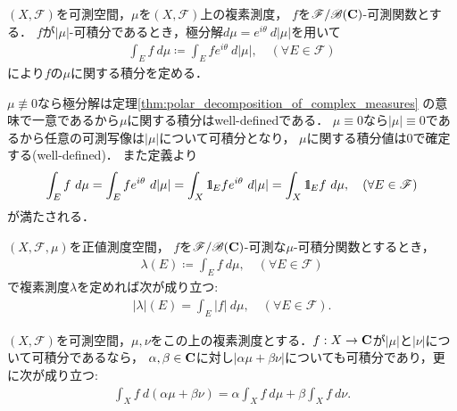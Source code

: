 	\begin{screen}
		\begin{dfn}[複素測度に関する積分]
			$(X,\mathscr{F})$を可測空間，$\mu$を$(X,\mathscr{F})$上の複素測度，
			$f$を$\mathscr{F}/\mathscr{B}(\mathbf{C})$-可測関数とする．
			$f$が$|\mu|$-可積分であるとき，極分解$d\mu = e^{i\theta}\ d|\mu|$を用いて
			\begin{align}
				\int_E f\ d\mu \coloneqq \int_E f e^{i \theta}\ d|\mu|,
				\quad (\forall E \in \mathscr{F})
			\end{align}
			により$f$の$\mu$に関する積分を定める．
		\end{dfn}
	\end{screen}
	
	$\mu \not\equiv 0$なら極分解は定理\ref{thm:polar_decomposition_of_complex_measures}
	の意味で一意であるから$\mu$に関する積分はwell-definedである．
	$\mu \equiv 0$なら$|\mu| \equiv 0$であるから任意の可測写像は$|\mu|$について可積分となり，
	$\mu$に関する積分値は0で確定する(well-defined)．
	また定義より
	\begin{align}
		\int_E f\ d\mu = \int_E f e^{i \theta}\ d|\mu|
		= \int_X \mbox{1}\hspace{-0.25em}\mbox{l}_E f e^{i\theta}\ d|\mu|
		= \int_X \mbox{1}\hspace{-0.25em}\mbox{l}_E f\ d\mu,
		\quad (\forall E \in \mathscr{F})
	\end{align}
	が満たされる．
	
	\begin{screen}
		\begin{thm}[総変動測度の積分表現]
			$(X,\mathscr{F},\mu)$を正値測度空間，
			$f$を$\mathscr{F}/\mathscr{B}(\mathbf{C})$-可測な$\mu$-可積分関数とするとき，
			\begin{align}
				\lambda(E) \coloneqq \int_E f\ d\mu, \quad (\forall E \in \mathscr{F})
			\end{align}
			で複素測度$\lambda$を定めれば次が成り立つ:
			\begin{align}
				|\lambda|(E) = \int_E |f|\ d\mu, \quad (\forall E \in \mathscr{F}).
			\end{align}
		\end{thm}
	\end{screen}
	
	\begin{screen}
		\begin{thm}[積分の測度に関する線型性]\label{thm:linearity_of_integral_respect_to_complex_measure}
			$(X,\mathscr{F})$を可測空間，$\mu,\nu$をこの上の複素測度とする．$f:X \rightarrow \mathbf{C}$が$|\mu|$と$|\nu|$について可積分であるなら，
			$\alpha,\beta \in \mathbf{C}$に対し$|\alpha \mu + \beta \nu|$についても可積分であり，更に次が成り立つ:
			\begin{align}
				\int_X f\ d(\alpha\mu + \beta\nu) = \alpha \int_X f\ d\mu + \beta \int_X f\ d\nu.
			\end{align}
		\end{thm}
	\end{screen}
	
